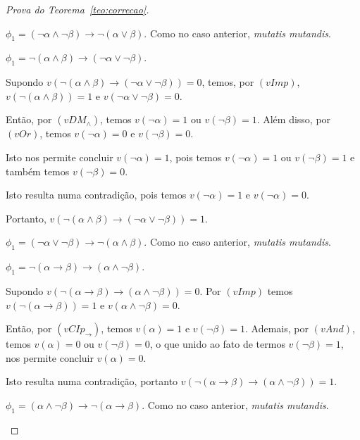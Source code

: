 \begin{proof}[Prova do Teorema~\ref{teo:correcao}]
\begin{provaporcasos}
\begin{provaporsubcasos}
                \subcasodeprova{} $\phi_{1} = (\neg \alpha \land \neg \beta) \to \neg (\alpha \lor \beta)$. Como no caso anterior, \textit{mutatis mutandis}.

                \subcasodeprova{} $\phi_{1} = \neg(\alpha \land \beta) \to (\neg \alpha \lor \neg \beta)$. 
                
                Supondo $v(\neg(\alpha \land \beta) \to (\neg \alpha \lor \neg \beta)) = 0$, temos, por $(vImp)$, $v(\neg(\alpha \land \beta)) = 1$ e $v(\neg \alpha \lor \neg \beta) = 0$. 
                
                Então, por $(vDM_{\land})$, temos $v(\neg \alpha) = 1$ ou $v(\neg \beta) = 1$. Além disso, por $(vOr)$, temos $v(\neg \alpha) = 0$ e $v(\neg \beta) = 0$. 
                
                Isto nos permite concluir $v(\neg \alpha) = 1$, pois temos $v(\neg \alpha) = 1$ ou $v(\neg \beta) = 1$ e também temos $v(\neg \beta) = 0$. 
                
                Isto resulta numa contradição, pois temos $v(\neg \alpha) = 1$ e $v(\neg \alpha) = 0$. 
                
                Portanto, $v(\neg(\alpha \land \beta) \to (\neg \alpha \lor \neg \beta)) = 1$.

                \subcasodeprova{} $\phi_{1} = (\neg \alpha \lor \neg \beta) \to \neg (\alpha \land \beta)$. Como no caso anterior, \textit{mutatis mutandis}.

                \subcasodeprova{} $\phi_{1} = \neg (\alpha \to \beta) \to(\alpha \land \neg \beta)$. 
                
                Supondo $v(\neg (\alpha \to \beta) \to (\alpha \land \neg \beta)) = 0$. Por $(vImp)$ temos $v(\neg (\alpha \to \beta)) = 1$ e $v(\alpha \land \neg \beta) = 0$. 
                
                Então, por $(vCIp_{\to})$, temos $v(\alpha) = 1$ e $v(\neg \beta) = 1$. Ademais, por $(vAnd)$, temos $v(\alpha) = 0$ ou $v(\neg \beta) = 0$, o que unido ao fato de termos $v(\neg \beta) = 1$, nos permite concluir $v(\alpha) = 0$. 
                
                Isto resulta numa contradição, portanto $v(\neg (\alpha \to \beta) \to (\alpha \land \neg \beta)) = 1$.

                \subcasodeprova{} $\phi_{1} = (\alpha \land \neg \beta) \to \neg(\alpha \to \beta)$. Como no caso anterior, \textit{mutatis mutandis}.
                

\end{provaporsubcasos}
\end{provaporcasos}
\end{proof}
